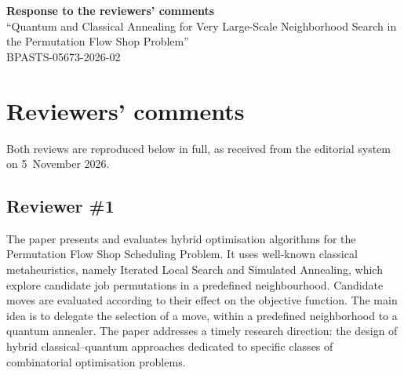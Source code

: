 \documentclass[12pt]{article}
\begin{document}
\begin{center}
{\large\bf Response to the reviewers' comments}\\[2mm]
``Quantum and Classical Annealing for Very Large-Scale Neighborhood Search in the Permutation Flow Shop Problem''\\[1mm]
BPASTS-05673-2026-02
\end{center}

\section*{Reviewers' comments}

Both reviews are reproduced below in full, as received from the editorial system on 5~November 2026.

\subsection*{Reviewer \#1}

The paper presents and evaluates hybrid optimisation algorithms for the Permutation Flow Shop Scheduling Problem. It uses well-known classical metaheuristics, namely Iterated Local Search and Simulated Annealing, which explore candidate job permutations in a predefined neighbourhood. Candidate moves are evaluated according to their effect on the objective function. The main idea is to delegate the selection of a move, within a predefined neighborhood to a quantum annealer. The paper addresses a timely research direction: the design of hybrid classical--quantum approaches dedicated to specific classes of combinatorial optimisation problems.
\end{document}
